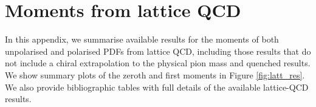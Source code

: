 \section{Moments from lattice QCD}
\label{sec:LQCDtables}

In this appendix, we summarise available results for the moments of both unpolarised and
polarised PDFs from lattice QCD, including those results that do not include a chiral extrapolation 
to the physical pion mass and quenched results. We show summary plots
of the zeroth and first moments in Figure \ref{fig:latt_res}. We also provide bibliographic tables with full
details of the available lattice-QCD results.

\begin{table}
\renewcommand{\arraystretch}{1.2} 
\centering %
\end{table}

